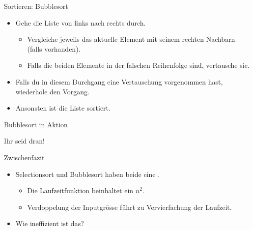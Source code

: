 
\begin{frame}{Sortieren: Bubblesort}
  \begin{itemize}
    \item Gehe die Liste von links nach rechts durch.
    \begin{itemize}
      \item Vergleiche jeweils das aktuelle Element mit seinem rechten Nachbarn (falls vorhanden).
      \item Falls die beiden Elemente in der falschen Reihenfolge sind, vertausche sie.
    \end{itemize}
    \item Falls du in diesem Durchgang eine Vertauschung vorgenommen hast, wiederhole den Vorgang.
    \item Ansonsten ist die Liste sortiert.
  \end{itemize}
\end{frame}

\begin{frame}{Bubblesort in Aktion}
  \vspace*{6mm}
\end{frame}

\begin{frame}[doit={zu zweit}, text=large]{Ihr seid dran!}
  \vfill
  \vfill
\end{frame}

\begin{frame}[text=large]{Zwischenfazit}
  \begin{itemize}
    \item Selectionsort und Bubblesort haben beide eine .
    \begin{itemize}
      \item Die Laufzeitfunktion beinhaltet ein $n^2$.
      \item Verdoppelung der Inputgrösse führt zu Vervierfachung der Laufzeit.
    \end{itemize}
    \item Wie ineffizient ist das?
  \end{itemize}
\end{frame}

